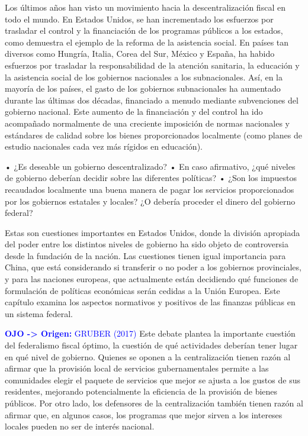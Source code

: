 \documentclass[10pt,a4paper]{article}
\begin{document}
Los últimos años han visto un movimiento hacia la descentralización fiscal en todo el mundo. En Estados Unidos, se han incrementado los esfuerzos por trasladar el control y la financiación de los programas públicos a los estados, como demuestra el ejemplo de la reforma de la asistencia social. En países tan diversos como Hungría, Italia, Corea del Sur, México y España, ha habido esfuerzos por trasladar la responsabilidad de la atención sanitaria, la educación y la asistencia social de los gobiernos nacionales a los subnacionales. Así, en la mayoría de los países, el gasto de los gobiernos subnacionales ha aumentado durante las últimas dos décadas, financiado a menudo mediante subvenciones del gobierno nacional. Este aumento de la financiación y del control ha ido acompañado normalmente de una creciente imposición de normas nacionales y estándares de calidad sobre los bienes proporcionados localmente (como planes de estudio nacionales cada vez más rígidos en educación).

• ¿Es deseable un gobierno descentralizado?
• En caso afirmativo, ¿qué niveles de gobierno deberían decidir sobre las diferentes políticas?
• ¿Son los impuestos recaudados localmente una buena manera de pagar los servicios proporcionados por los gobiernos estatales y locales? ¿O debería proceder el dinero del gobierno federal?

Estas son cuestiones importantes en Estados Unidos, donde la división apropiada del poder entre los distintos niveles de gobierno ha sido objeto de controversia desde la fundación de la nación. Las cuestiones tienen igual importancia para China, que está considerando si transferir o no poder a los gobiernos provinciales, y para las naciones europeas, que actualmente están decidiendo qué funciones de formulación de políticas económicas serán cedidas a la Unión Europea. Este capítulo examina los aspectos normativos y positivos de las finanzas públicas en un sistema federal.

\textcolor{blue}{\textbf{OJO -> Origen:} GRUBER (2017)}
Este debate plantea la importante cuestión del federalismo fiscal óptimo, la cuestión de qué actividades deberían tener lugar en qué nivel de gobierno. Quienes se oponen a la centralización tienen razón al afirmar que la provisión local de servicios gubernamentales permite a las comunidades elegir el paquete de servicios que mejor se ajusta a los gustos de sus residentes, mejorando potencialmente la eficiencia de la provisión de bienes públicos. Por otro lado, los defensores de la centralización también tienen razón al afirmar que, en algunos casos, los programas que mejor sirven a los intereses locales pueden no ser de interés nacional.
\end{document}
